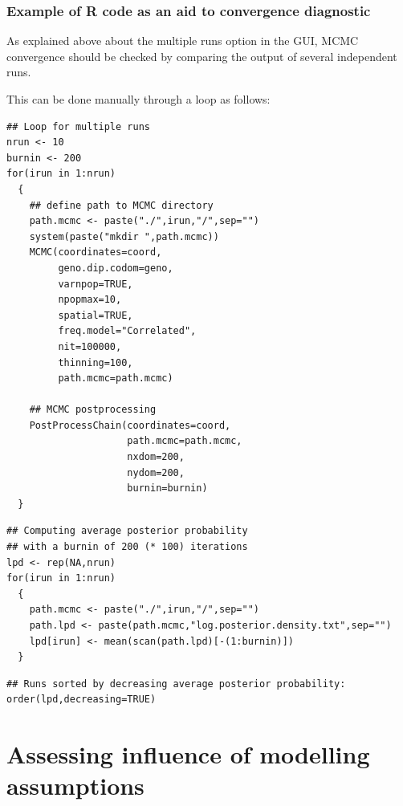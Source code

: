 \documentclass{article}
\begin{document}
\subsubsection{Example of R code as an aid to convergence diagnostic}
As explained above about the multiple runs option in the GUI, MCMC convergence should be checked by comparing the output of 
several independent runs. 

This can be done manually through a loop as follows:\\




\begin{verbatim}
## Loop for multiple runs
nrun <- 10
burnin <- 200
for(irun in 1:nrun)
  {
    ## define path to MCMC directory
    path.mcmc <- paste("./",irun,"/",sep="")   
    system(paste("mkdir ",path.mcmc))
    MCMC(coordinates=coord,
         geno.dip.codom=geno,
         varnpop=TRUE, 
         npopmax=10,
         spatial=TRUE,
         freq.model="Correlated",
         nit=100000,
         thinning=100,
         path.mcmc=path.mcmc)

    ## MCMC postprocessing
    PostProcessChain(coordinates=coord,
                     path.mcmc=path.mcmc,
                     nxdom=200,
                     nydom=200,
                     burnin=burnin)
  }
\end{verbatim}



\bigskip

\begin{verbatim}
## Computing average posterior probability
## with a burnin of 200 (* 100) iterations
lpd <- rep(NA,nrun)
for(irun in 1:nrun)
  {
    path.mcmc <- paste("./",irun,"/",sep="")
    path.lpd <- paste(path.mcmc,"log.posterior.density.txt",sep="")
    lpd[irun] <- mean(scan(path.lpd)[-(1:burnin)])
  }
\end{verbatim}



\bigskip

\begin{verbatim}
## Runs sorted by decreasing average posterior probability:
order(lpd,decreasing=TRUE)

\end{verbatim}




\clearpage
\section[Influence of model assumptions]{Assessing influence of modelling assumptions}
\end{document}
